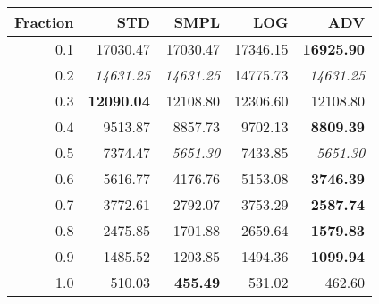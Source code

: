 \documentclass{standalone}
\begin{document}
\begin{tabular}{r|rrrr}
      \toprule
      Fraction & STD & SMPL & LOG & ADV\\
      \midrule
      0.1 & 17030.47 & 17030.47 & 17346.15 & \textbf{16925.90}\\
  0.2 & \emph{14631.25} & \emph{14631.25} & 14775.73 & \emph{14631.25}\\
  0.3 & \textbf{12090.04} & 12108.80 & 12306.60 & 12108.80\\
  0.4 & 9513.87 & 8857.73 & 9702.13 & \textbf{8809.39}\\
  0.5 & 7374.47 & \emph{5651.30} & 7433.85 & \emph{5651.30}\\
  0.6 & 5616.77 & 4176.76 & 5153.08 & \textbf{3746.39}\\
  0.7 & 3772.61 & 2792.07 & 3753.29 & \textbf{2587.74}\\
  0.8 & 2475.85 & 1701.88 & 2659.64 & \textbf{1579.83}\\
  0.9 & 1485.52 & 1203.85 & 1494.36 & \textbf{1099.94}\\
  1.0 & 510.03 & \textbf{455.49} & 531.02 & 462.60\\
  \bottomrule
\end{tabular}
\end{document}
